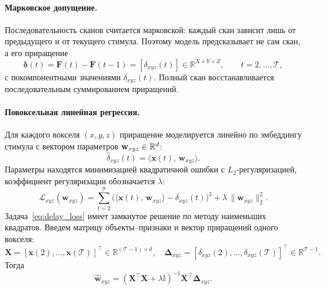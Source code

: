 \paragraph{Марковское допущение.}
Последовательность сканов считается марковской: каждый скан зависит лишь от предыдущего и от текущего стимула. Поэтому модель предсказывает не сам скан, а его приращение
\begin{equation}\label{eq:delta}
\boldsymbol{\delta}(t) = \mathbf{F}(t) - \mathbf{F}(t-1) = \left[\delta_{xyz}(t)\right] \in \mathbb{R}^{X\times Y \times Z}, \qquad t = 2, \ldots, \mathcal{T},
\end{equation}
с покомпонентными значениями $\delta_{xyz}(t)$.
Полный скан восстанавливается последовательным суммированием приращений.

\paragraph{Повоксельная линейная регрессия.}
Для каждого вокселя $(x, y, z)$ приращение моделируется линейно по эмбеддингу стимула с вектором параметров $\mathbf{w}_{xyz} \in \mathbb{R}^{d}$:
\begin{equation*}
\widehat{\delta}_{xyz}(t) = \langle \mathbf{x}(t),\, \mathbf{w}_{xyz} \rangle.
\end{equation*}
Параметры находятся минимизацией квадратичной ошибки с $L_2$-регуляризацией, коэффициент регуляризации обозначается $\lambda$:
\begin{equation}\label{eq:delay_loss}
\mathcal{L}_{xyz}(\mathbf{w}_{xyz}) = \sum_{t=2}^{\mathcal{T}} \big( \langle \mathbf{x}(t),\, \mathbf{w}_{xyz} \rangle - \delta_{xyz}(t) \big)^2 + \lambda \, \| \mathbf{w}_{xyz} \|_2^2 .
\end{equation}
Задача~\eqref{eq:delay_loss} имеет замкнутое решение по методу наименьших квадратов. Введем матрицу объекты--признаки и вектор приращений одного вокселя:
\begin{equation*}\label{eq:delay_design}
\mathbf{X} = [\mathbf{x}(2), \ldots, \mathbf{x}(\mathcal{T})]^{\top} \in \mathbb{R}^{(\mathcal{T}-1) \times d}, \quad \boldsymbol{\Delta}_{xyz} = [\delta_{xyz}(2), \ldots, \delta_{xyz}(\mathcal{T})]^{\top} \in \mathbb{R}^{\mathcal{T}-1}.
\end{equation*}
Тогда
\begin{equation}\label{eq:delay_solution}
\widehat{\mathbf{w}}_{xyz} = (\mathbf{X}^{\top} \mathbf{X} + \lambda \mathbb{I})^{-1} \mathbf{X}^{\top} \boldsymbol{\Delta}_{xyz}.
\end{equation}

